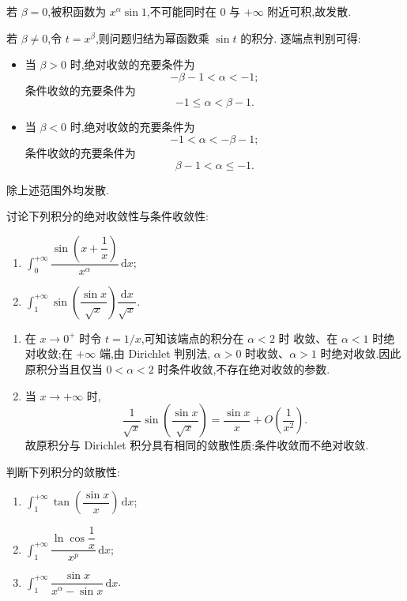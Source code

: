 \begin{solution}
  若 $\beta=0$,被积函数为 $x^\alpha\sin1$,不可能同时在 $0$ 与
  $+\infty$ 附近可积,故发散.

  若 $\beta\neq0$,令 $t=x^\beta$,则问题归结为幂函数乘 $\sin t$ 的积分.
  逐端点判别可得:
  \begin{itemize}
    \item 当 $\beta>0$ 时,绝对收敛的充要条件为
          \[
            -\beta-1<\alpha<-1;
          \]
          条件收敛的充要条件为
          \[
            -1\leq\alpha<\beta-1.
          \]
    \item 当 $\beta<0$ 时,绝对收敛的充要条件为
          \[
            -1<\alpha<-\beta-1;
          \]
          条件收敛的充要条件为
          \[
            \beta-1<\alpha\leq-1.
          \]
  \end{itemize}
  除上述范围外均发散.
\end{solution}

\begin{example}
  讨论下列积分的绝对收敛性与条件收敛性:
  \begin{enumerate}
    \item $\displaystyle\int_0^{+\infty}\dfrac{\sin\left(x+\dfrac{1}{x}\right)}{x^\alpha}\,\mathrm{d}x$;
    \item $\displaystyle\int_1^{+\infty}\sin\left(\dfrac{\sin x}{\sqrt{x}}\right)\dfrac{\mathrm{d}x}{\sqrt{x}}$.
  \end{enumerate}
\end{example}
\exampleblank

\begin{solution}
  \begin{enumerate}
    \item 在 $x\to0^+$ 时令 $t=1/x$,可知该端点的积分在 $\alpha<2$ 时
          收敛、在 $\alpha<1$ 时绝对收敛;在 $+\infty$ 端,由 Dirichlet 判别法,
          $\alpha>0$ 时收敛、$\alpha>1$ 时绝对收敛.因此原积分当且仅当
          $0<\alpha<2$ 时条件收敛,不存在绝对收敛的参数.

    \item 当 $x\to+\infty$ 时,
          \[
            \dfrac{1}{\sqrt{x}}\sin\left(\dfrac{\sin x}{\sqrt{x}}\right)
            =\dfrac{\sin x}{x}+O\left(\dfrac{1}{x^2}\right).
          \]
          故原积分与 Dirichlet 积分具有相同的敛散性质:条件收敛而不绝对收敛.
  \end{enumerate}
\end{solution}

\begin{example}
  判断下列积分的敛散性:
  \begin{enumerate}
    \item $\displaystyle\int_1^{+\infty}\tan\left(\dfrac{\sin x}{x}\right)\,\mathrm{d}x$;
    \item $\displaystyle\int_1^{+\infty}\dfrac{\ln\cos\dfrac{1}{x}}{x^p}\,\mathrm{d}x$;
    \item $\displaystyle\int_1^{+\infty}\dfrac{\sin x}{x^\alpha-\sin x}\,\mathrm{d}x$.
  \end{enumerate}
\end{example}
\exampleblank

